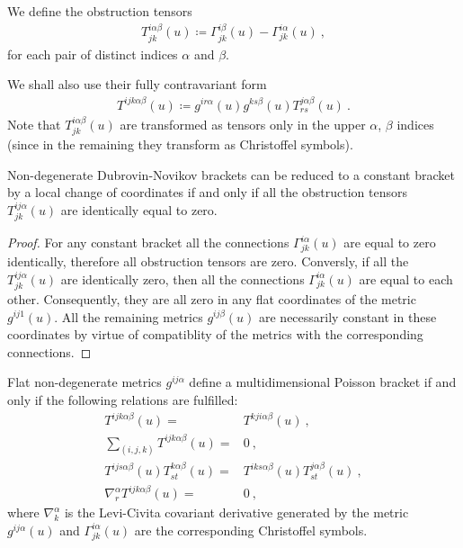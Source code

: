 \begin{definition}
    We define the obstruction tensors
    \begin{align}
        T^{i \alpha \beta}_{jk} (u) \coloneqq \Gamma^{i \beta}_{jk}(u) - \Gamma^{i \alpha}_{jk}(u) \:,
    \end{align}
    for each pair of distinct indices $\alpha$ and $\beta$.
\end{definition}
We shall also use their fully contravariant form
\begin{align}
    T^{ijk \alpha \beta}(u) \coloneqq g^{i r \alpha}(u) g^{ks \beta}(u) T^{j \alpha \beta}_{rs} (u) \:.
\end{align}
Note that $T^{i \alpha \beta}_{jk} (u)$ are transformed as tensors only in the upper $\alpha$, $\beta$ indices (since in the remaining they transform as Christoffel symbols).

\begin{lemma} \label{lemma:T=0}
    Non-degenerate Dubrovin-Novikov brackets can be reduced to a constant bracket by a local change of coordinates if and only if all the obstruction tensors $T^{ij \alpha}_{jk}(u)$ are identically equal to zero.
\end{lemma}
\begin{proof}
    For any constant bracket all the connections $\Gamma^{i\alpha}_{jk}(u)$ are equal to zero identically, therefore all obstruction tensors are zero. Conversly, if all the $T^{ij \alpha}_{jk}(u)$ are identically zero, then all the connections $\Gamma^{i\alpha}_{jk}(u)$ are equal to each other. Consequently, they are all zero in any flat coordinates of the metric $g^{ij 1}(u)$. All the remaining metrics $g^{ij \beta}(u)$ are necessarily constant in these coordinates by virtue of compatiblity of the metrics with the corresponding connections.
\end{proof}


\begin{theorem}
    Flat non-degenerate metrics $g^{ij \alpha}$ define a multidimensional Poisson bracket if and only if the following relations are fulfilled:
    \begin{align}
        T^{ijk \alpha \beta}(u) =& T^{kji \alpha \beta}(u) \:, \label{eq:Mochov-1}\\
        \sum_{(i,j,k)} T^{ijk \alpha \beta}(u) =& 0 \:, \label{eq:Mochov-2}\\
        T^{ij s \alpha \beta}(u) T^{k \alpha \beta}_{st}(u) =& T^{i k s \alpha \beta}(u) T^{j \alpha \beta}_{st} (u) \:, \label{eq:Mochov-3}\\
        \nabla^\alpha_r T^{ijk \alpha \beta}(u) =& 0 \:, \label{eq:Mochov-4}
    \end{align}
    where $\nabla^\alpha_k$ is the Levi-Civita covariant derivative generated by the metric $g^{ij \alpha}(u)$ and $\Gamma^{i \alpha}_{jk}(u)$ are the corresponding Christoffel symbols. 
\end{theorem}

